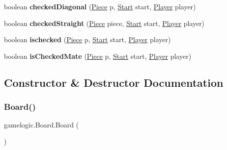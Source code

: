 \begin{DoxyCompactItemize}
\item 
\mbox{\label{classgamelogic_1_1_board_aec8b979bfaf8320644667436411499d4}} 
boolean {\bfseries checked\+Diagonal} (\mbox{\hyperlink{classgamelogic_1_1_piece}{Piece}} p, \mbox{\hyperlink{classgamelogic_1_1_start}{Start}} start, \mbox{\hyperlink{classgamelogic_1_1_player}{Player}} player)
\item 
\mbox{\label{classgamelogic_1_1_board_a345735c653c636c63e5d4a1c312ed52e}} 
boolean {\bfseries checked\+Straight} (\mbox{\hyperlink{classgamelogic_1_1_piece}{Piece}} piece, \mbox{\hyperlink{classgamelogic_1_1_start}{Start}} start, \mbox{\hyperlink{classgamelogic_1_1_player}{Player}} player)
\item 
\mbox{\label{classgamelogic_1_1_board_a8f3209c457b8aac5858e2c4afe3aba40}} 
boolean {\bfseries ischecked} (\mbox{\hyperlink{classgamelogic_1_1_piece}{Piece}} p, \mbox{\hyperlink{classgamelogic_1_1_start}{Start}} start, \mbox{\hyperlink{classgamelogic_1_1_player}{Player}} player)
\item 
\mbox{\label{classgamelogic_1_1_board_aebde91e5d27a19818613c722f3741054}} 
boolean {\bfseries is\+Checked\+Mate} (\mbox{\hyperlink{classgamelogic_1_1_piece}{Piece}} p, \mbox{\hyperlink{classgamelogic_1_1_start}{Start}} start, \mbox{\hyperlink{classgamelogic_1_1_player}{Player}} player)
\end{DoxyCompactItemize}


\subsection{Constructor \& Destructor Documentation}
\mbox{\label{classgamelogic_1_1_board_a00654e3d421a89e0532462dc48d85a25}} 
\subsubsection{\texorpdfstring{Board()}{Board()}}
{\footnotesize\ttfamily gamelogic.\+Board.\+Board (\begin{DoxyParamCaption}{ }\end{DoxyParamCaption})}

